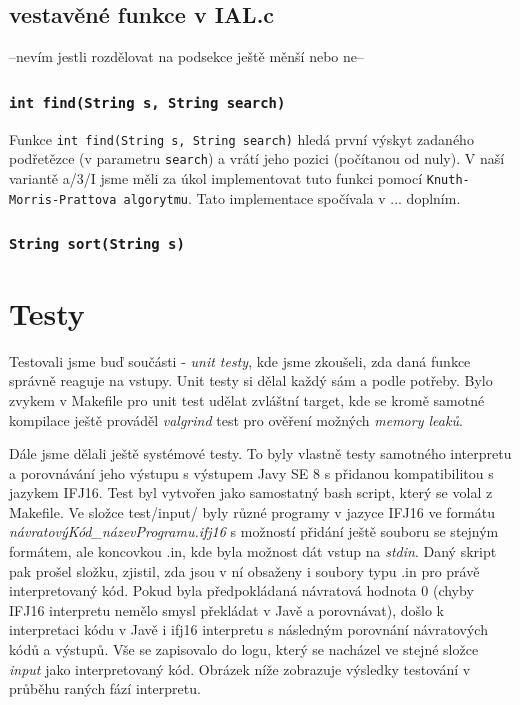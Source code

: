\documentclass[a4paper,11pt]{article}
\begin{document}
\subsection {vestavěné funkce v IAL.c}
--nevím jestli rozdělovat na podsekce ještě měnší nebo ne--
\subsubsection {\texttt{int find(String s, String search)}}
Funkce \texttt{int find(String s, String search)} hledá první výskyt zadaného podřetězce (v parametru \texttt{search}) a vrátí jeho pozici (počítanou od nuly). V naší variantě a/3/I jsme měli za úkol implementovat tuto funkci pomocí \texttt{Knuth-Morris-Prattova algorytmu}. Tato implementace spočívala v ... doplním.
\subsubsection {\texttt{String sort(String s)}}
\section{Testy}
Testovali jsme buď součásti - \textit{unit testy}, kde jsme zkoušeli, zda daná funkce správně reaguje na vstupy. Unit testy si dělal každý sám a podle potřeby. Bylo zvykem v Makefile pro unit test udělat zvláštní target, kde se kromě samotné kompilace ještě prováděl \textit{valgrind} test pro ověření možných \textit{memory leaků}. 

Dále jsme dělali ještě systémové testy. To byly vlastně testy samotného interpretu a porovnávání jeho výstupu s výstupem Javy SE 8 s přidanou kompatibilitou s jazykem IFJ16. Test byl vytvořen jako samostatný bash script, který se volal z Makefile. Ve složce test/input/ byly různé programy v jazyce IFJ16 ve formátu \textit{návratovýKód\_názevProgramu.ifj16} s možností přidání ještě souboru se stejným formátem, ale koncovkou .in, kde byla možnost dát vstup na \textit{stdin}. Daný skript pak prošel složku, zjistil, zda jsou v ní obsaženy i soubory typu .in pro právě interpretovaný kód. Pokud byla předpokládaná návratová hodnota 0 (chyby IFJ16 interpretu nemělo smysl překládat v Javě a porovnávat), došlo k interpretaci kódu v Javě i ifj16 interpretu s následným porovnání návratových kódů a výstupů. Vše se zapisovalo do logu, který se nacházel ve stejné složce \textit{input} jako interpretovaný kód. Obrázek níže zobrazuje výsledky testování v průběhu raných fází interpretu.\\
\end{document}
